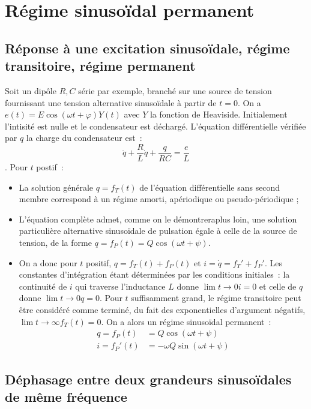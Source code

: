 \chapter{Régime sinusoïdal permanent}
\minitoc
\minilof
\minilot

\section{Réponse à une excitation sinusoïdale, régime transitoire, régime permanent}
    Soit un dipôle \(R, C\) série par exemple, branché sur une source de tension fournissant une tension alternative sinusoïdale à partir de \(t=0\). On a \(e(t) = E\cos(\omega t + \varphi) Y(t)\) avec \(Y\) la fonction de Heaviside. Initialement l'intisité est nulle et le condensateur est déchargé. L'équation différentielle vérifiée par \(q\) la charge du condensateur est~: \[ \ddot{q} + \frac{R}{L} \dot{q} + \frac{q}{RC} = \frac{e}{L} \]. Pour \(t\) postif~:
    \begin{itemize}
        \item La solution générale \(q= f_T(t)\) de l'équation différentielle sans second membre correspond à un régime amorti, apériodique ou pseudo-périodique ;
        \item L'équation complète admet, comme on le démontreraplus loin, une solution particulière alternative sinusoïdale de pulsation égale à celle de la source de tension, de la forme \(q = f_P(t) = Q \cos(\omega t +\psi)\).
        \item On a donc pour \(t\) positif, \(q = f_T(t) + f_P(t)\) et \(i = \dot{q} = f_T' + f_P'\). Les constantes d'intégration étant déterminées par les conditions initiales~: la continuité de \(i\) qui traverse l'inductance \(L\) donne \(\lim\limits{t \to 0} i = 0\) et celle de \(q\) donne \(\lim\limits{t \to 0} q = 0\). Pour \(t\) suffisamment grand, le régime transitoire peut être considéré comme terminé, du fait des exponentielles d'argument négatifs, \(\lim\limits{t \to \infty} f_T(t) = 0\). On a alors un régime sinusoïdal permanent~:
        \begin{align}
            q = f_P(t) &= Q \cos(\omega t +\psi) \\
            i = f_P'(t) &= -\omega Q\sin(\omega t +\psi)
        \end{align}
    \end{itemize}
\section{Déphasage entre deux grandeurs sinusoïdales de même fréquence}
